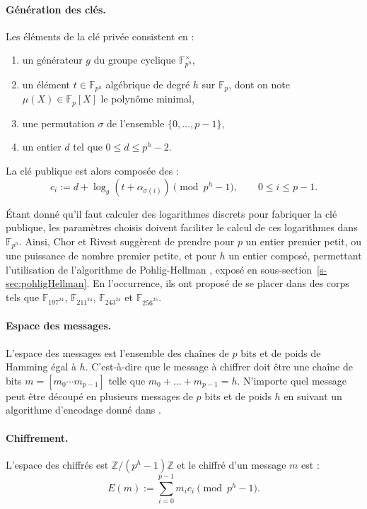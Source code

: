 \documentclass[a4paper, titlepage, 11pt]{article}
\theoremstyle{definition}
\theoremstyle{remark}
\def\Z{\mathbb Z}
\def\gf #1{\mathbb{F}_{#1}}
\begin{document}
\paragraph{Génération des clés.} Les éléments de la clé privée consistent en :
\begin{enumerate}
\item un générateur $g$ du groupe cyclique $\gf{p^h}^\times$,
\item un élément $t \in \gf{p^h}$ algébrique de degré $h$ sur $\gf{p}$, dont on note $\mu(X) \in \gf{p}[X]$ le polynôme minimal,
\item une permutation $\sigma$ de l'ensemble $\{0, \dots, p-1\}$,
\item un entier $d$ tel que $0 \leqslant d \leqslant p^h-2$.
\end{enumerate}
La clé publique est alors composée des :
$$c_i := d + \log_g\left(t + \alpha_{\sigma(i)}\right) \pmod{p^h-1}, \qquad 0 \leqslant i \leqslant p-1.$$

\'Etant donné qu'il faut calculer des logarithmes discrets pour fabriquer la clé publique, les paramètres choisis doivent faciliter le calcul de ces logarithmes dans $\gf{p^h}$. Ainsi, Chor et Rivest suggèrent de prendre pour $p$ un entier premier petit, ou une puissance de nombre premier petite, et pour $h$ un entier composé, permettant l'utilisation de l'algorithme de Pohlig-Hellman \cite{pohligHellman1978}, exposé en sous-section~\ref{s-sec:pohligHellman}. En l’occurrence, ils ont proposé de se placer dans des corps tels que $\gf{197^{24}}$, $\gf{211^{24}}$, $\gf{243^{24}}$ et $\gf{256^{25}}$.

\paragraph{Espace des messages.}L'espace des messages est l'ensemble des chaînes de $p$ bits et de poids de Hamming égal à $h$. C'est-à-dire que le message à chiffrer doit être une chaîne de bits $m = [m_0\cdots m_{p-1}]$ telle que $m_0+\dots + m_{p-1} = h$. N'importe quel message peut être découpé en plusieurs messages de $p$ bits et de poids $h$ en suivant un algorithme d'encodage donné dans \cite[IV.B.]{chorRivest1988}.

\paragraph{Chiffrement.}L'espace des chiffrés est $\Z/(p^h-1)\Z$ et le chiffré d'un message $m$ est :
$$E(m) := \sum_{i=0}^{p-1} m_ic_i \pmod{p^h-1}.$$
\end{document}
